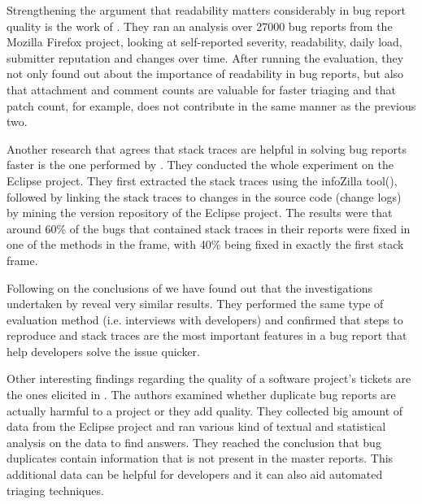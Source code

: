 \documentclass{mprop}
\begin{document}
Strengthening the argument that readability matters considerably in bug report 
quality is the work of \citet{hooimeijer2007modeling}. They ran an analysis over
27000 bug reports from the Mozilla Firefox project, looking at self-reported 
severity, readability, daily load, submitter reputation and changes over time. 
After running the evaluation, they not only found out about the importance of
readability in bug reports, but also that attachment and comment counts are 
valuable for faster triaging and that patch count, for example, does not
contribute in the same manner as the previous two.

Another research that agrees that stack traces are helpful in solving bug
reports faster is the one performed by \citet{schroter2010stack}. They conducted
the whole experiment on the Eclipse project. They first extracted the stack
traces using the infoZilla tool(\citep{bettenburg2008extracting}), followed by
linking the stack traces to changes in the source code (change logs) by mining
the version repository of the Eclipse project. The results were that 
around 60\% of the bugs that contained stack traces in their reports were fixed
in one of the methods in the frame, with 40\% being fixed in exactly the first
stack frame.

Following on the conclusions of \citet{bettenburg2008makes} we have found out
that the investigations undertaken by \citet{bettenburg2007quality} reveal 
very similar results. They performed the same type of evaluation method (i.e. 
interviews with developers) and confirmed that steps to reproduce and stack traces
are the most important features in a bug report that help developers solve the
issue quicker.

Other interesting findings regarding the quality of a software project's tickets
are the ones elicited in \citet{bettenburg2008duplicate}. The authors examined
whether duplicate bug reports are actually harmful to a project or they add 
quality. They collected big amount of data from the Eclipse project and ran
various kind of textual and statistical analysis on the data to find answers.
They reached the conclusion that bug duplicates contain information that is not
present in the master reports. This additional data can be helpful for developers
and it can also aid automated triaging techniques.
\end{document}
